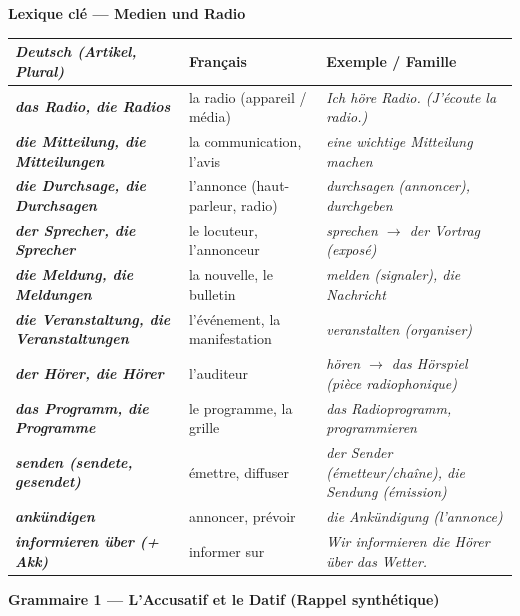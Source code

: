 \documentclass[11pt]{article}
\newcommand{\all}[1]{\ifmmode\text{\textit{#1}}\else\begingroup\selectlanguage{ngerman}\itshape #1\endgroup\fi}
\begin{document}
\begin{bilan}

\textbf{Lexique clé — Medien und Radio}

\begin{center}
\begin{tabularx}{\linewidth}{|>{\bfseries}l|X|X|}\hline
\rowcolor{popblueL}
\all{Deutsch (Artikel, Plural)} & \textbf{Français} & \textbf{Exemple / Famille} \\ \hline
\all{das Radio, die Radios} & la radio (appareil / média) & \all{Ich höre Radio.} (J'écoute la radio.) \\ \hline
\all{die Mitteilung, die Mitteilungen} & la communication, l'avis & \all{eine wichtige Mitteilung machen} \\ \hline
\all{die Durchsage, die Durchsagen} & l'annonce (haut-parleur, radio) & \all{durchsagen} (annoncer), \all{durchgeben} \\ \hline
\all{der Sprecher, die Sprecher} & le locuteur, l'annonceur & \all{sprechen} $\to$ \all{der Vortrag} (exposé) \\ \hline
\all{die Meldung, die Meldungen} & la nouvelle, le bulletin & \all{melden} (signaler), \all{die Nachricht} \\ \hline
\all{die Veranstaltung, die Veranstaltungen} & l'événement, la manifestation & \all{veranstalten} (organiser) \\ \hline
\all{der Hörer, die Hörer} & l'auditeur & \all{hören} $\to$ \all{das Hörspiel} (pièce radiophonique) \\ \hline
\all{das Programm, die Programme} & le programme, la grille & \all{das Radioprogramm}, \all{programmieren} \\ \hline
\all{senden (sendete, gesendet)} & émettre, diffuser & \all{der Sender} (émetteur/chaîne), \all{die Sendung} (émission) \\ \hline
\all{ankündigen} & annoncer, prévoir & \all{die Ankündigung} (l'annonce) \\ \hline
\all{informieren über (+ Akk)} & informer sur & \all{Wir informieren die Hörer über das Wetter.} \\ \hline
\end{tabularx}
\end{center}

\vspace{0.5cm}
\textbf{Grammaire 1 — L'Accusatif et le Datif (Rappel synthétique)}


\end{bilan}
\end{document}
